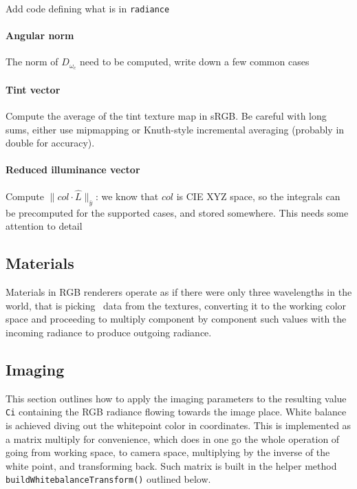 \begin{inconstruction}
Add code defining what is in \Verb|radiance|

    \paragraph{Angular norm}

    The norm of $D_{\omega_c}$ need to be computed, write down a few common
    cases

    \paragraph{Tint vector}

    Compute the average of the tint texture map in \gls{sRGB}.
    Be careful with long sums, either use mipmapping or Knuth-style
    incremental averaging (probably in double for accuracy).

    \paragraph{Reduced illuminance vector}

    Compute $\|col\cdot \hat L\|_{\bar y}$: we know that $col$ is
    \gls{CIE} \gls{XYZ} space, so the integrals can be precomputed
    for the supported cases, and stored somewhere.
    This needs some attention to detail
\end{inconstruction}


\subsection{Materials}

Materials in \gls{RGB} renderers operate as if there were only three wavelengths in
the world, that is picking \sRGBl\ data from the textures, converting it to the
working color space and proceeding to multiply component by component such values
with the incoming radiance to produce outgoing radiance.


\subsection{Imaging}

This section outlines how to apply the imaging parameters to the resulting value
\Verb|Ci| containing the \gls{RGB} radiance flowing towards the image place.
White balance is achieved diving out the whitepoint color in \camRGBl coordinates.
This is implemented as a matrix multiply for convenience, which does in one go
the whole operation of going from working space, to camera space, multiplying by
 the inverse of the white point, and transforming back. Such matrix is built in
 the helper method
\Verb|buildWhitebalanceTransform()| outlined below.

